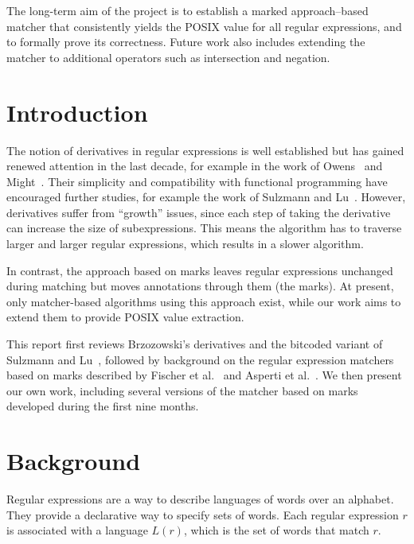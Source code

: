 \documentclass[12pt]{article}
\begin{document}
The long-term aim of the project is to establish a marked approach--based matcher that consistently yields the POSIX value for all regular expressions, and to formally prove its correctness.  
Future work also includes extending the matcher to additional operators such as intersection and negation.  

\newpage

\tableofcontents

\newpage

\section{Introduction}

The notion of derivatives in regular expressions is well established but has gained renewed 
attention in the last decade, for example in the work of Owens~\cite{Owens2009} and Might~\cite{Might2011}.
Their simplicity and compatibility with functional programming have encouraged further studies, 
for example the work of Sulzmann and Lu~\cite{Sulzmann2014}.  
However, derivatives suffer from “growth” issues, since each step of taking the derivative 
can increase the size of subexpressions. This means the algorithm has to traverse larger and 
larger regular expressions, which results in a slower algorithm.  

In contrast, the approach based on marks leaves regular expressions unchanged during matching but moves 
annotations through them (the marks). At present, only matcher-based algorithms using this approach exist,
 while our work aims to extend them to provide POSIX value extraction. 

This report first reviews Brzozowski's derivatives and the bitcoded variant of 
Sulzmann and Lu~\cite{Sulzmann2014}, followed by background on the regular 
expression matchers based on marks described by Fischer et al.~\cite{Fischer2010} 
and Asperti et al.~\cite{Asperti2010}.  
We then present our own work, including several versions of the matcher based 
on marks developed during the first nine months.

\section{Background}

Regular expressions are a way to describe languages of words over an alphabet.
They provide a declarative way to specify sets of words. Each regular
expression $r$ is associated with a language $L(r)$, which is the set of words
that match $r$. 
\end{document}
